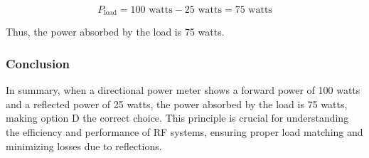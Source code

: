 \[
P_{\text{load}} = 100 \text{ watts} - 25 \text{ watts} = 75 \text{ watts}
\]

Thus, the power absorbed by the load is 75 watts.

\subsubsection{Conclusion}

In summary, when a directional power meter shows a forward power of 100 watts and a reflected power of 25 watts, the power absorbed by the load is 75 watts, making option D the correct choice. This principle is crucial for understanding the efficiency and performance of RF systems, ensuring proper load matching and minimizing losses due to reflections.
